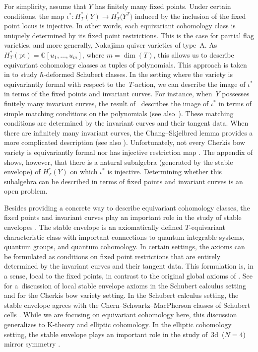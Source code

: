 \documentclass[pdftex]{sigma}
\numberwithin{equation}{section}
\newcommand{\CC}{\mathbb C}
\newcommand{\pt}{\mathrm{pt}}
\begin{document}
For simplicity, assume that $Y$ has finitely many fixed points. Under certain conditions, the map $\iota^*\colon H^*_T (Y) \to H^*_T \bigl(Y^T\bigr)$ induced by the inclusion of the fixed point locus is injective. In other words, each equivariant cohomology class is uniquely determined by its fixed point restrictions. This is the case for partial flag varieties, and more generally, Nakajima quiver varieties of type~A. As $H^*_T(\pt) = \CC[u_1, \dots , u_m]$, where $m = \dim(T)$, this allows us to describe equivariant cohomology classes as tuples of polynomials. This approach is taken in \cite{R} to study $\hbar$-deformed Schubert classes. In the setting where the variety is equivariantly formal with respect to the~$T$-action, we can describe the image of $\iota^*$ in terms of the fixed points and invariant curves. For instance, when~$Y$ possesses finitely many invariant curves, the result of~\cite{GKM} describes the image of $\iota^*$ in terms of simple matching conditions on the polynomials (see also~\cite{Ty}). These matching conditions are determined by the invariant curves and their tangent data. When there are infinitely many invariant curves, the Chang--Skjelbred lemma \cite{CS} provides a more complicated description (see also \cite{equiv_coh}). Unfortunately, not every Cherkis bow variety is equivariantly formal nor has injective restriction map \cite{yibo}. The appendix of \cite{BR} shows, however, that there is a natural subalgebra (generated by the stable envelope) of $H^*_T(Y)$ on which $\iota^*$ is injective. Determining whether this subalgebra can be described in terms of fixed points and invariant curves is an open problem.

Besides providing a concrete way to describe equivariant cohomology classes, the fixed points and invariant curves play an important role in the study of stable envelopes \cite{AO, MO}. The stable envelope is an axiomatically defined $T$-equivariant characteristic class with important connections to quantum integrable systems, quantum groups, and quantum cohomology. In certain settings, the axioms can be formulated as conditions on fixed point restrictions that are entirely determined by the invariant curves and their tangent data. This formulation is, in a sense, local to the fixed points, in contrast to the original global axioms of \cite{AO, MO}. See \cite{RTV1, RTV2, RTV3} for a~discussion of local stable envelope axioms in the Schubert calculus setting and \cite[Section~7]{RS} for the Cherkis bow variety setting. In the Schubert calculus setting, the stable envelope agrees with the Chern--Schwartz--MacPherson classes of Schubert cells \cite{motivic_overview}. While we are focusing on equivariant cohomology here, this discussion generalizes to K-theory and elliptic cohomology. In the elliptic cohomology setting, the stable envelope plays an important role in the study of~3d~($N = 4$) mirror symmetry \cite{BR, fullflag_mirror, grassman_mirror, SZ}.
\end{document}
